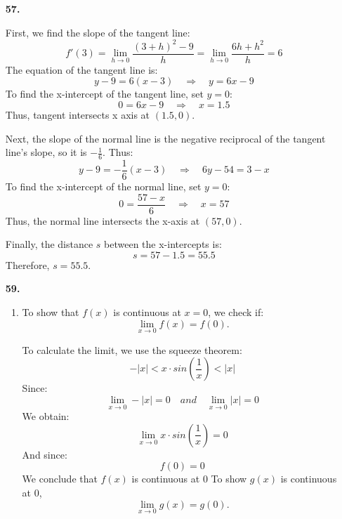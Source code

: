\documentclass[12pt]{article}
\begin{document}


\begin{enumerate}[start=1,label={\bfseries. },leftmargin=1in] %
    \item [\textbf{57.}]

    First, we find the slope of the tangent line:
    \[
    f'(3) = \lim_{h \to 0} \frac{(3 + h)^2 - 9}{h} = \lim_{h \to 0} \frac{6h + h^2}{h} = 6
    \]
    The equation of the tangent line is:
    \[
    y - 9 = 6(x - 3) \quad \Rightarrow \quad y = 6x - 9
    \]
    To find the x-intercept of the tangent line, set \( y = 0 \):
    \[
    0 = 6x - 9 \quad \Rightarrow \quad x = 1.5
    \]
    Thus, tangent intersects x axis at \( (1.5, 0) \).

    Next, the slope of the normal line is the negative reciprocal of the tangent line's slope, so it is \( -\frac{1}{6} \). Thus:
    \[
    y - 9 = -\frac{1}{6}(x - 3) \quad \Rightarrow \quad 6y-54 = 3-x
    \]
    To find the x-intercept of the normal line, set \( y = 0 \):
    \[
    0 = \frac{57-x}{6} \quad \Rightarrow \quad x = 57
    \]
    Thus, the normal line intersects the x-axis at \( (57, 0) \).

    Finally, the distance \( s \) between the x-intercepts is:
    \[
    s = 57 - 1.5 = 55.5
    \]
    Therefore, \( s = {55.5} \).

    \item [\textbf{59.}]
    
    \begin{enumerate}
        \item 
        To show that \( f(x) \) is continuous at \( x = 0 \), we check if:
        \[
        \lim_{x \to 0} f(x) = f(0).
        \]
        
        To calculate the limit, we use the squeeze theorem:
        \[
        -|x| < x\cdot sin\left(\frac{1}{x}\right) < |x|
        \]
        Since:
        \[
        \lim_{x\to0} -|x| = 0 \quad and \quad \lim_{x\to0}|x| = 0
        \]
        We obtain:
        \[
        \lim_{x\to0}x\cdot sin\left(\frac{1}{x}\right) = 0
        \]
        And since:
        \[
        f(0) = 0
        \]
        We conclude that $f(x)$ is continuous at 0
        \bigbreak
        To show $g(x)$ is continuous at 0,
        \[
        \lim_{x \to 0} g(x) = g(0).
        \]
        

\end{enumerate}
\end{enumerate}
\end{document}
